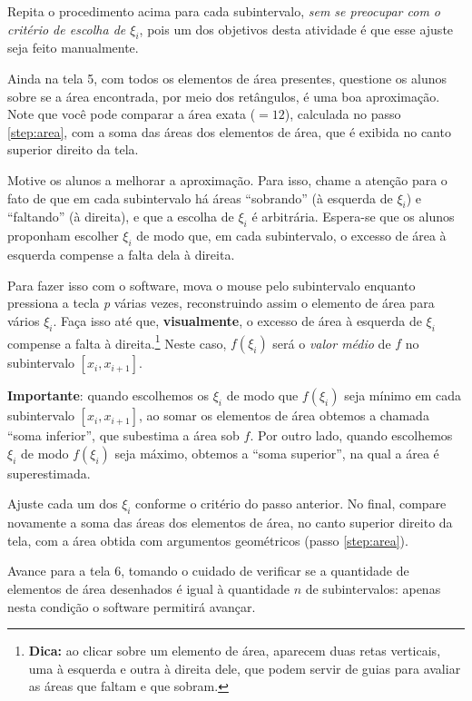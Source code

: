 \documentclass[a4paper,12pt]{scrartcl}
\newcommand\importante{\textbf{Importante}}
\begin{document}
\begin{list}{.}
      Repita o procedimento acima para cada subintervalo, \emph{sem se preocupar com o critério de escolha de $\xi_i$}, pois um dos objetivos desta atividade é que esse ajuste seja feito manualmente.
      
      \item Ainda na tela 5, com todos os elementos de área presentes, questione os alunos sobre se a área encontrada, por meio dos retângulos, é uma boa aproximação. Note que você pode comparar a área exata ($=12$), calculada no passo \ref{step:area}, com a soma das áreas dos elementos de área, que é exibida no canto superior direito da tela.
      
      \item Motive os alunos a melhorar a aproximação. Para isso, chame a atenção para o fato de que em cada subintervalo há áreas ``sobrando'' (à esquerda de $\xi_i$) e ``faltando'' (à direita), e que a escolha de $\xi_i$ é arbitrária. Espera-se que os alunos proponham escolher $\xi_i$ de modo que, em cada subintervalo, o excesso de área à esquerda compense a falta dela à direita.
      
      Para fazer isso com o software, mova o mouse pelo subintervalo enquanto pressiona a tecla \textit{p} várias vezes, reconstruindo assim o elemento de área para vários $\xi_i$. Faça isso até que, \textbf{visualmente}, o excesso de área à esquerda de $\xi_i$ compense a falta à direita.\footnote{\textbf{Dica:} ao clicar sobre um elemento de área, aparecem duas retas verticais, uma à esquerda e outra à direita dele, que podem servir de guias para avaliar as áreas que faltam e que sobram.} Neste caso, $f(\xi_i)$ será o \emph{valor médio} de $f$ no subintervalo $[x_i, x_{i+1}]$.
      
      \importante: quando escolhemos os $\xi_i$ de modo que $f(\xi_i)$ seja mínimo em cada subintervalo $[x_i,x_{i+1}]$, ao somar os elementos de área obtemos a chamada ``soma inferior'', que subestima a área sob $f$. Por outro lado, quando escolhemos $\xi_i$ de modo $f(\xi_i)$ seja máximo, obtemos a ``soma superior'', na qual a área é superestimada.
      
      \item Ajuste cada um dos $\xi_i$ conforme o critério do passo anterior. No final, compare novamente a soma das áreas dos elementos de área, no canto superior direito da tela, com a área obtida com argumentos geométricos (passo \ref{step:area}).
      
      Avance para a tela 6, tomando o cuidado de verificar se a quantidade de elementos de área desenhados é igual à quantidade $n$ de subintervalos: apenas nesta condição o software permitirá avançar.
      

\end{list}
\end{document}
